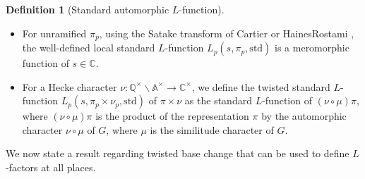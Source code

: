 \documentclass[11pt, a4paper]{amsart}
\theoremstyle{plain}
\theoremstyle{definition}
\newtheorem{definition}[theorem]{Definition}
\numberwithin{equation}{section}
\def\AAA{\mathbb{A}}
\def\CC{\mathbb{C}}
\def\QQ{\mathbb{Q}}
\begin{document}
\begin{definition}[Standard automorphic $L$-function]
\begin{itemize}
\begin{align*}
\begin{pmatrix}
                                           \end{pmatrix}, \\
        & 1 \rtimes \sigma \mapsto \begin{pmatrix}
                                     & 1_{3} \\
                                     1_{3} &       \\
                                   \end{pmatrix}. 
    \end{align*}
    \item For unramified $\pi_{p}$, using the Satake transform of Cartier \cite{Cartier79} or Haines\textendash Rostami \cite{Haines-Rostami10}, the well-defined local standard $L$-function $L_{p}(s, \pi_{p}, \mathrm{std})$ is a meromorphic function of $s \in \CC$. 
    \item For a Hecke character $\nu \colon \QQ^{\times} \backslash \AAA^{\times} \rightarrow \CC^{\times}$, we define the twisted standard $L$-function $L_{p}(s, \pi_{p} \times \nu_{p}, \mathrm{std})$ of $\pi \times \nu$ as the standard $L$-function of $(\nu \circ \mu) \pi$, where $(\nu \circ \mu) \pi$ is the product of the representation $\pi$ by the automorphic character $\nu \circ \mu$ of $G$, where $\mu$ is the similitude character of $G$. 
    \end{itemize}
\end{definition}

We now state a result regarding twisted base change that can be used to define $L$-factors at all places. 
\end{document}

